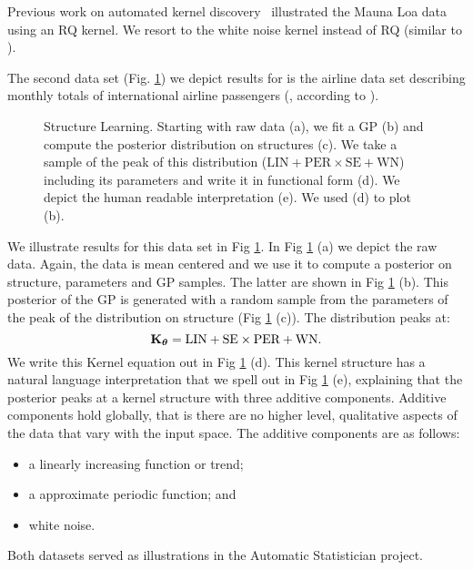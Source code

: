 Previous work on automated kernel discovery~\citep{duvenaud2013structure} illustrated the Mauna Loa data using an RQ kernel.
We resort to the white noise kernel instead of RQ (similar to \citep{lloyd2014automatic}).


The second data set (Fig. \ref{fig:posterior_airline}) we depict results for is  the airline 
data set describing monthly totals of international airline passengers (\citealp{box2011time}, according to \citealp{duvenaud2013structure}). 
\begin{figure}
\centering

\caption{\small Structure Learning. Starting with raw data (a), we fit a \ac{GP}
(b) and compute the posterior distribution on structures (c). We take a sample
of the peak of this distribution ($\text{LIN}+\text{PER} \times \text{SE}+\text{WN}$)
including its parameters and write it in functional form (d). We depict the
human readable interpretation (e). We used (d) to plot (b).}\label{fig:posterior_airline}
\end{figure}

We illustrate results for this data set in Fig \ref{fig:posterior_airline}. In Fig \ref{fig:posterior_airline} (a) we depict the raw data. 
Again, the data is mean centered and we use it to 
compute a posterior on structure, parameters and \ac{GP}
samples.
The latter are shown in  Fig \ref{fig:posterior_airline} (b).
This posterior of the \ac{GP} is generated with a random sample from the parameters
of the peak of the distribution on structure (Fig \ref{fig:posterior_airline} (c)).
The distribution peaks at:
\begin{equation}
\mathbf{K}_{\bm{\theta}}=\text{LIN} +  \text{SE} \times \text{PER}+ \text{WN}.
\end{equation}
We write this Kernel equation out in Fig \ref{fig:posterior_airline} (d).
This kernel structure has a natural language interpretation that we spell out in
Fig \ref{fig:posterior_airline} (e), explaining that 
the posterior peaks at a kernel structure with three additive components.
Additive components hold globally, that is there are no higher level, qualitative aspects
of the data that vary with the input space.
The additive components are as follows: 
\begin{itemize}
\item a linearly increasing function or trend;
\item a approximate periodic function; and
\item  white noise.
\end{itemize}
Both datasets served as illustrations in the Automatic Statistician project.



